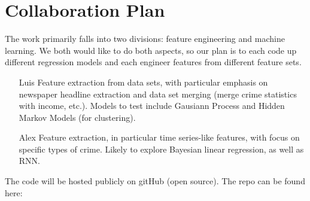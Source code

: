 \documentclass[10pt]{article}
\begin{document}
\section{Collaboration Plan}
The work primarily falls into two divisions: feature engineering and machine learning. We both would like to do both aspects, so our plan is to each code up different regression models and each engineer features from different feature sets.

\begin{itemize}
\item[Luis] Feature extraction from data sets, with particular emphasis on newspaper headline extraction and data set merging (merge crime statistics with income, etc.). Models to test include Gausiann Process and Hidden Markov Models (for clustering).
\item[Alex] Feature extraction, in particular time series-like features, with focus on specific types of crime. Likely to explore Bayesian linear regression, as well as RNN.
\end{itemize}
The code will be hosted publicly on gitHub (open source). The repo can be found here:
\end{document}
